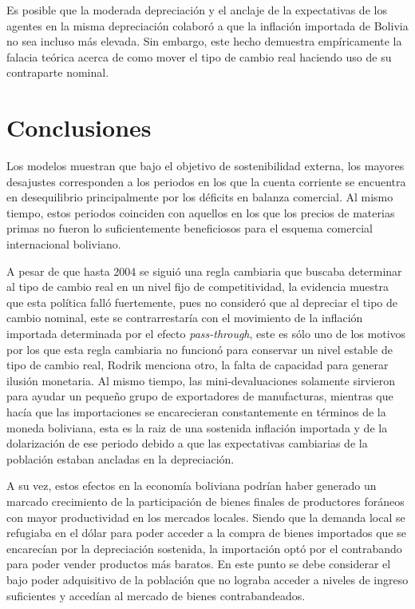 \documentclass[12pt,letterpaper]{article}
\begin{document}
Es posible que la moderada depreciación y el anclaje de la expectativas de los agentes en la misma depreciación colaboró a que la inflación importada de Bolivia no sea incluso más elevada. Sin embargo, este hecho demuestra empíricamente la falacia teórica acerca de como mover el tipo de cambio real haciendo uso de su contraparte nominal.

\section*{Conclusiones}\label{concl}

Los modelos muestran que bajo el objetivo de sostenibilidad externa, los mayores desajustes corresponden a los periodos en los que la cuenta corriente se encuentra en desequilibrio principalmente por los déficits en balanza comercial. Al mismo tiempo, estos periodos coinciden con aquellos en los que los precios de materias primas no fueron lo suficientemente beneficiosos para el esquema comercial internacional boliviano.

A pesar de que hasta 2004 se siguió una regla cambiaria que buscaba determinar al tipo de cambio real en un nivel fijo de competitividad, la evidencia muestra que esta política falló fuertemente, pues no consideró que al depreciar el tipo de cambio nominal, este se contrarrestaría con el movimiento de la inflación importada determinada por el efecto \emph{pass-through}, este es sólo uno de los motivos por los que esta regla cambiaria no funcionó para conservar un nivel estable de tipo de cambio real, Rodrik menciona otro, la falta de capacidad para generar ilusión monetaria. Al mismo tiempo, las mini-devaluaciones solamente sirvieron para ayudar un pequeño grupo de exportadores de manufacturas, mientras que hacía que las importaciones se encarecieran constantemente en términos de la moneda boliviana, esta es la raiz de una sostenida inflación importada y de la dolarización de ese periodo debido a que las expectativas cambiarias de la población estaban ancladas en la depreciación.

A su vez, estos efectos en la economía boliviana podrían haber generado un marcado crecimiento de la participación de bienes finales de productores foráneos con mayor productividad en los mercados locales. Siendo que la demanda local se refugiaba en el dólar para poder acceder a la compra de bienes importados que se encarecían por la depreciación sostenida, la importación optó por el contrabando para poder vender productos más baratos. En este punto se debe considerar el bajo poder adquisitivo de la población que no lograba acceder a niveles de ingreso suficientes y accedían al mercado de bienes contrabandeados.
\end{document}
